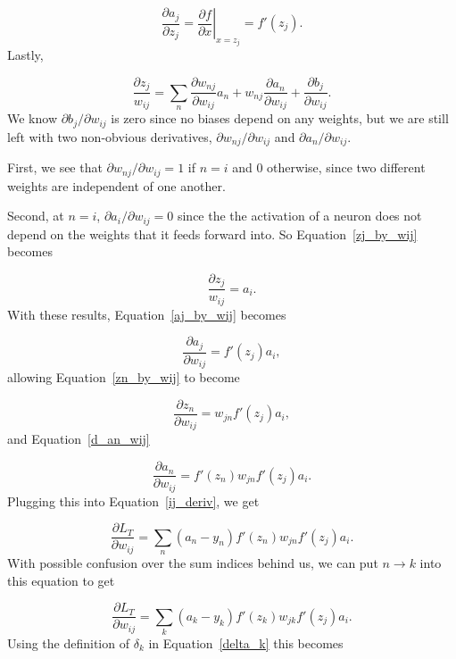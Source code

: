 \documentclass[12pt]{article}
\begin{document}
\begin{equation}
\frac{\partial{a_j}}{\partial z_j}=\left . \frac{\partial f}{\partial x}\right\vert_{x=z_j}=f'(z_j).
\end{equation}
Lastly,

\begin{equation}
\frac{\partial z_j}{w_{ij}}=\sum_n \frac{\partial w_{nj}}{\partial w_{ij}}a_n+w_{nj}\frac{\partial a_n}{\partial w_{ij}}+\frac{\partial b_j}{\partial w_{ij}}.
\label{zj_by_wij}
\end{equation}
We know $\partial b_j/\partial w_{ij}$ is zero since no biases depend on any weights, but we are still left with two non-obvious derivatives, $\partial w_{nj}/\partial w_{ij}$ and $\partial {a_n}/{\partial w_{ij}}$.  

First, we see that $\partial w_{nj}/\partial w_{ij}=1$ if $n=i$ and $0$ otherwise, since two different weights are independent of one another.  

Second,  at $n=i$, $\partial {a_i}/{\partial w_{ij}}=0$ since the the activation of a neuron does not depend on the weights that it feeds forward into. So Equation~\ref{zj_by_wij} becomes

\begin{equation}
\frac{\partial z_j}{w_{ij}}=a_i.
\end{equation}
With these results, Equation~\ref{aj_by_wij} becomes

\begin{equation}
\frac{\partial{a_j}}{\partial w_{ij}}=f'(z_j)a_i,
\end{equation}
allowing Equation~\ref{zn_by_wij} to become

\begin{equation}
\frac{\partial z_n}{\partial w_{ij}}=w_{jn}f'(z_j)a_i,
\end{equation}
and Equation~\ref{d_an_wij}

\begin{equation}
\frac{\partial a_n}{\partial w_{ij}} =f'(z_n)w_{jn}f'(z_j)a_i.
\label{d_an_wij_filled}
\end{equation}
Plugging this into Equation~\ref{ij_deriv}, we get

\begin{equation}
\frac{\partial L_T}{\partial w_{ij}} = \sum_n (a_n-y_n)f'(z_n)w_{jn}f'(z_j)a_i.
\end{equation}
With possible confusion over the sum indices behind us, we can put $n\rightarrow k$ into this equation to get

\begin{equation}
\frac{\partial L_T}{\partial w_{ij}} = \sum_k (a_k-y_k)f'(z_k)w_{jk}f'(z_j)a_i.
\end{equation}
Using the definition of $\delta_k$ in Equation~\ref{delta_k} this becomes
\end{document}
